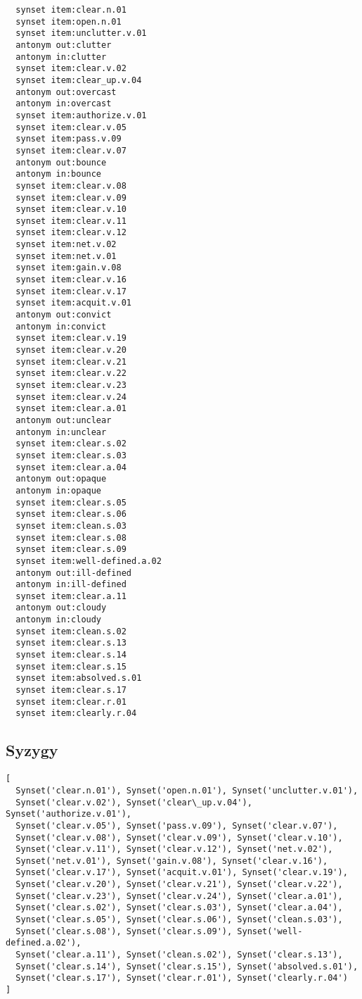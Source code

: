 \begin{multicols}{2}
  \begin{verbatim}
  synset item:clear.n.01
  synset item:open.n.01
  synset item:unclutter.v.01
  antonym out:clutter
  antonym in:clutter
  synset item:clear.v.02
  synset item:clear_up.v.04
  antonym out:overcast
  antonym in:overcast
  synset item:authorize.v.01
  synset item:clear.v.05
  synset item:pass.v.09
  synset item:clear.v.07
  antonym out:bounce
  antonym in:bounce
  synset item:clear.v.08
  synset item:clear.v.09
  synset item:clear.v.10
  synset item:clear.v.11
  synset item:clear.v.12
  synset item:net.v.02
  synset item:net.v.01
  synset item:gain.v.08
  synset item:clear.v.16
  synset item:clear.v.17
  synset item:acquit.v.01
  antonym out:convict
  antonym in:convict
  synset item:clear.v.19
  synset item:clear.v.20
  synset item:clear.v.21
  synset item:clear.v.22
  synset item:clear.v.23
  synset item:clear.v.24
  synset item:clear.a.01
  antonym out:unclear
  antonym in:unclear
  synset item:clear.s.02
  synset item:clear.s.03
  synset item:clear.a.04
  antonym out:opaque
  antonym in:opaque
  synset item:clear.s.05
  synset item:clear.s.06
  synset item:clean.s.03
  synset item:clear.s.08
  synset item:clear.s.09
  synset item:well-defined.a.02
  antonym out:ill-defined
  antonym in:ill-defined
  synset item:clear.a.11
  antonym out:cloudy
  antonym in:cloudy
  synset item:clean.s.02
  synset item:clear.s.13
  synset item:clear.s.14
  synset item:clear.s.15
  synset item:absolved.s.01
  synset item:clear.s.17
  synset item:clear.r.01
  synset item:clearly.r.04
  \end{verbatim}
\end{multicols}


\subsection{Syzygy}
\label{app:syzygy}

\begin{verbatim}
[
  Synset('clear.n.01'), Synset('open.n.01'), Synset('unclutter.v.01'), 
  Synset('clear.v.02'), Synset('clear\_up.v.04'), Synset('authorize.v.01'),
  Synset('clear.v.05'), Synset('pass.v.09'), Synset('clear.v.07'), 
  Synset('clear.v.08'), Synset('clear.v.09'), Synset('clear.v.10'), 
  Synset('clear.v.11'), Synset('clear.v.12'), Synset('net.v.02'), 
  Synset('net.v.01'), Synset('gain.v.08'), Synset('clear.v.16'), 
  Synset('clear.v.17'), Synset('acquit.v.01'), Synset('clear.v.19'), 
  Synset('clear.v.20'), Synset('clear.v.21'), Synset('clear.v.22'), 
  Synset('clear.v.23'), Synset('clear.v.24'), Synset('clear.a.01'), 
  Synset('clear.s.02'), Synset('clear.s.03'), Synset('clear.a.04'), 
  Synset('clear.s.05'), Synset('clear.s.06'), Synset('clean.s.03'), 
  Synset('clear.s.08'), Synset('clear.s.09'), Synset('well-defined.a.02'), 
  Synset('clear.a.11'), Synset('clean.s.02'), Synset('clear.s.13'), 
  Synset('clear.s.14'), Synset('clear.s.15'), Synset('absolved.s.01'), 
  Synset('clear.s.17'), Synset('clear.r.01'), Synset('clearly.r.04')
]
\end{verbatim}


